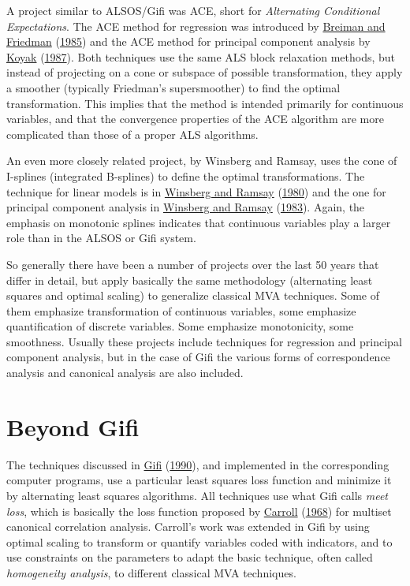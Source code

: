\documentclass[
  12pt,
]{book}
\begin{document}
A project similar to ALSOS/Gifi was ACE, short for \emph{Alternating Conditional Expectations}. The ACE method for regression was introduced by \protect\hyperlink{ref-breiman_friedman_85}{Breiman and Friedman} (\protect\hyperlink{ref-breiman_friedman_85}{1985}) and the ACE method for principal component analysis by
\protect\hyperlink{ref-koyak_87}{Koyak} (\protect\hyperlink{ref-koyak_87}{1987}). Both techniques use the same ALS block relaxation methods, but instead of projecting on a cone or subspace of possible transformation, they apply a smoother (typically Friedman's supersmoother) to find the
optimal transformation. This implies that the method is intended primarily for continuous variables, and that the convergence properties of the ACE algorithm are more complicated than those of a proper ALS algorithms.

An even more closely related project, by Winsberg and Ramsay, uses the cone of I-splines (integrated B-splines)
to define the optimal transformations. The technique for linear models is in \protect\hyperlink{ref-winsberg_ramsay_80}{Winsberg and Ramsay} (\protect\hyperlink{ref-winsberg_ramsay_80}{1980}) and the one for
principal component analysis in \protect\hyperlink{ref-winsberg_ramsay_83}{Winsberg and Ramsay} (\protect\hyperlink{ref-winsberg_ramsay_83}{1983}). Again, the emphasis on monotonic splines indicates that
continuous variables play a larger role than in the ALSOS or Gifi system.

So generally there have been a number of projects over the last 50 years that differ in detail, but apply basically the same methodology (alternating least squares and optimal scaling) to generalize classical MVA techniques. Some of them emphasize transformation of continuous variables, some emphasize quantification of discrete variables. Some emphasize monotonicity, some smoothness. Usually these projects include techniques for regression and principal component analysis, but in the case of Gifi the various forms of correspondence analysis and canonical analysis are also included.

\hypertarget{beyond-gifi}{%
\section{Beyond Gifi}\label{beyond-gifi}}

The techniques discussed in \protect\hyperlink{ref-gifi_B_90}{Gifi} (\protect\hyperlink{ref-gifi_B_90}{1990}), and implemented in the corresponding computer programs, use a particular least squares loss function and minimize it by alternating least squares algorithms. All techniques use what Gifi calls \emph{meet loss}, which is basically the loss function proposed by \protect\hyperlink{ref-carroll_68}{Carroll} (\protect\hyperlink{ref-carroll_68}{1968}) for multiset canonical correlation analysis. Carroll's work was extended in Gifi by using optimal scaling to transform or quantify variables coded with indicators, and to use constraints on the parameters to adapt the basic technique, often called \emph{homogeneity analysis}, to different classical MVA techniques.
\end{document}
